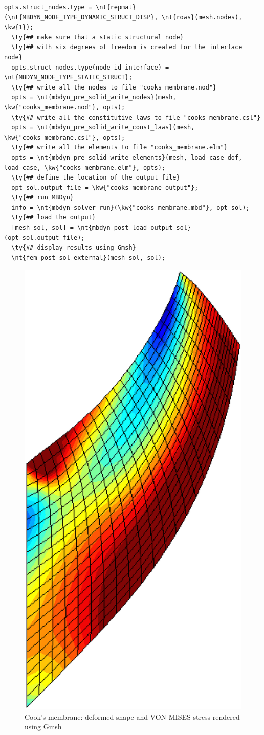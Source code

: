 \begin{Verbatim}[commandchars=\\\{\}]
  opts.struct_nodes.type = \nt{repmat}(\nt{MBDYN_NODE_TYPE_DYNAMIC_STRUCT_DISP}, \nt{rows}(mesh.nodes), \kw{1});
  \ty{## make sure that a static structural node}
  \ty{## with six degrees of freedom is created for the interface node}
  opts.struct_nodes.type(node_id_interface) = \nt{MBDYN_NODE_TYPE_STATIC_STRUCT};
  \ty{## write all the nodes to file "cooks_membrane.nod"}
  opts = \nt{mbdyn_pre_solid_write_nodes}(mesh, \kw{"cooks_membrane.nod"}, opts);
  \ty{## write all the constitutive laws to file "cooks_membrane.csl"}
  opts = \nt{mbdyn_pre_solid_write_const_laws}(mesh, \kw{"cooks_membrane.csl"}, opts);
  \ty{## write all the elements to file "cooks_membrane.elm"}
  opts = \nt{mbdyn_pre_solid_write_elements}(mesh, load_case_dof, load_case, \kw{"cooks_membrane.elm"}, opts);
  \ty{## define the location of the output file}
  opt_sol.output_file = \kw{"cooks_membrane_output"};
  \ty{## run MBDyn}
  info = \nt{mbdyn_solver_run}(\kw{"cooks_membrane.mbd"}, opt_sol);
  \ty{## load the output}
  [mesh_sol, sol] = \nt{mbdyn_post_load_output_sol}(opt_sol.output_file);
  \ty{## display results using Gmsh}
  \nt{fem_post_sol_external}(mesh_sol, sol);
\end{Verbatim}

\begin{figure}[htb]
\centering
\includegraphics[width=.25\textwidth]{elemsolid}
\caption{Cook's membrane: deformed shape and VON MISES stress rendered using Gmsh}
\label{fig:EL:SOLID:COOKS-MEMBRANE}
\end{figure}
\clearpage
